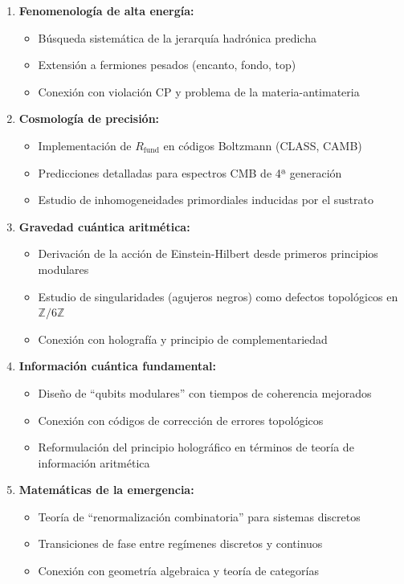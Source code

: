 \documentclass[11pt, a4paper]{article}
\theoremstyle{plain}
\theoremstyle{definition}
\newcommand{\Zmod}{\mathbb{Z}/6\mathbb{Z}}
\newcommand{\Rfactor}{R_{\text{fund}}}
\begin{document}
\begin{enumerate}
    \item \textbf{Fenomenología de alta energía:}
    \begin{itemize}
        \item Búsqueda sistemática de la jerarquía hadrónica predicha
        \item Extensión a fermiones pesados (encanto, fondo, top)
        \item Conexión con violación CP y problema de la materia-antimateria
    \end{itemize}
    
    \item \textbf{Cosmología de precisión:}
    \begin{itemize}
        \item Implementación de $\Rfactor$ en códigos Boltzmann (CLASS, CAMB)
        \item Predicciones detalladas para espectros CMB de 4ª generación
        \item Estudio de inhomogeneidades primordiales inducidas por el sustrato
    \end{itemize}
    
    \item \textbf{Gravedad cuántica aritmética:}
    \begin{itemize}
        \item Derivación de la acción de Einstein-Hilbert desde primeros principios modulares
        \item Estudio de singularidades (agujeros negros) como defectos topológicos en $\Zmod$
        \item Conexión con holografía y principio de complementariedad
    \end{itemize}
    
    \item \textbf{Información cuántica fundamental:}
    \begin{itemize}
        \item Diseño de ``qubits modulares'' con tiempos de coherencia mejorados
        \item Conexión con códigos de corrección de errores topológicos
        \item Reformulación del principio holográfico en términos de teoría de información aritmética
    \end{itemize}
    
    \item \textbf{Matemáticas de la emergencia:}
    \begin{itemize}
        \item Teoría de ``renormalización combinatoria'' para sistemas discretos
        \item Transiciones de fase entre regímenes discretos y continuos
        \item Conexión con geometría algebraica y teoría de categorías
    \end{itemize}
\end{enumerate}
\end{document}
